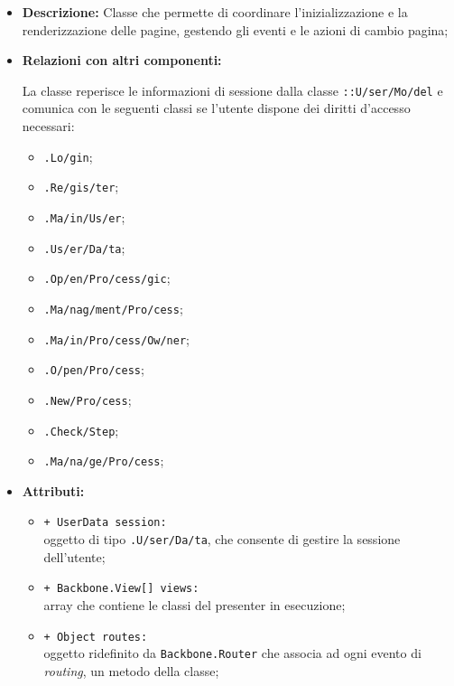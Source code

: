 \begin{flushleft}
\begin{itemize}
\item \textbf{Descrizione:} Classe che permette di coordinare l'inizializzazione e la renderizzazione delle pagine, gestendo gli eventi e le azioni di cambio pagina;
\item \textbf{Relazioni con altri componenti:}
\begin{sloppypar}
La classe reperisce le informazioni di sessione dalla classe \texttt{\model{}::U\fshyp{}ser\fshyp{}Mo\fshyp{}del} e comunica con le seguenti classi se l'utente dispone dei diritti d'accesso necessari:
\begin{itemize}
\item \texttt{\logic{}.Lo\fshyp{}gin};
\item \texttt{\logicUser{}.Re\fshyp{}gis\fshyp{}ter};
\item \texttt{\logicUser{}.Ma\fshyp{}in\fshyp{}Us\fshyp{}er};
\item \texttt{\logicUser{}.Us\fshyp{}er\fshyp{}Da\fshyp{}ta};
\item \texttt{\logicUser{}.Op\fshyp{}en\fshyp{}Pro\fshyp{}cess\fshyp{}gic};
\item \texttt{\logicUser{}.Ma\fshyp{}nag\fshyp{}ment\fshyp{}Pro\fshyp{}cess};
\item \texttt{\logicAdmin{}.Ma\fshyp{}in\fshyp{}Pro\fshyp{}cess\fshyp{}Ow\fshyp{}ner};
\item \texttt{\logicAdmin{}.O\fshyp{}pen\fshyp{}Pro\fshyp{}cess};
\item \texttt{\logicAdmin{}.New\fshyp{}Pro\fshyp{}cess};
\item \texttt{\logicAdmin{}.Check\fshyp{}Step};
\item \texttt{\logicAdmin{}.Ma\fshyp{}na\fshyp{}ge\fshyp{}Pro\fshyp{}cess};
\end{itemize}
\end{sloppypar}
\item \textbf{Attributi:}
\begin{sloppypar}
\begin{itemize}
\item \texttt{+ UserData session:}\\ oggetto di tipo \texttt{\model{}.U\fshyp{}ser\fshyp{}Da\fshyp{}ta}, che consente di gestire la sessione dell'utente;
\item \texttt{+ Backbone.View[] views:}\\ array che contiene le classi del presenter in esecuzione;
\item \texttt{+ Object routes:}\\ oggetto ridefinito da \texttt{Backbone.Router} che associa ad ogni evento di \textit{routing}, un metodo della classe;

\end{itemize}
\end{sloppypar}
\end{itemize}
\end{flushleft}
